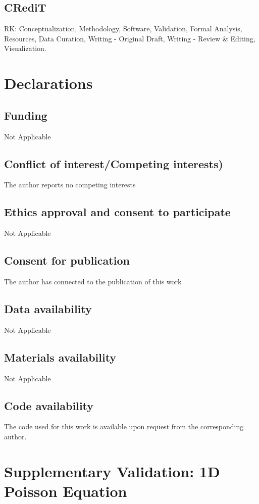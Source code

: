 \documentclass[11pt, a4paper]{article}
\begin{document}
\subsection*{CRediT}
RK: Conceptualization, Methodology, Software, Validation, Formal Analysis, Resources, Data Curation, Writing - Original Draft, Writing - Review \& Editing, Visualization.


\section*{Declarations}

\subsection*{Funding}
Not Applicable
\subsection*{Conflict of interest/Competing interests)}
The author reports no competing interests
\subsection*{Ethics approval and consent to participate}
Not Applicable
\subsection*{Consent for publication}
The author has connected to the publication of this work

\subsection*{Data availability}
Not Applicable

\subsection*{Materials availability}
Not Applicable

\subsection*{Code availability}
The code used for this work is available upon request from the corresponding author.




\appendix

\section{Supplementary Validation: 1D Poisson Equation}
\label{appendix:poisson_validation}
\end{document}
